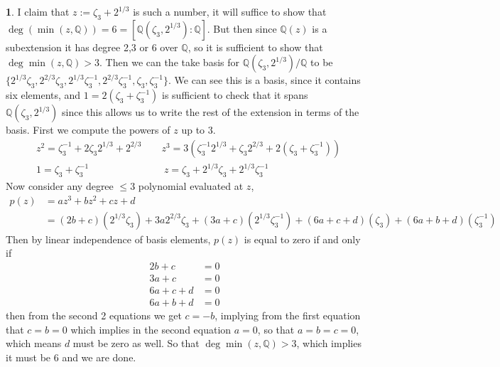 \documentclass[11pt]{article}
\theoremstyle{definition}
\newtheorem{pb}{}
\newcommand{\set}[1]{\{#1\}}
\begin{document}
    \begin{pb}
        I claim that \(z := \zeta_3 + 2^{1/3}\) is such a number, it will suffice to show that \(\deg(\min(z,\mathbb{Q})) = 6 = [\mathbb{Q}(\zeta_3,2^{1/3}):\mathbb{Q}]\).
        But then since \(\mathbb{Q}(z)\) is a subextension it has degree 2,3 or 6 over \(\mathbb{Q}\), so it is sufficient to show that \(\deg \min(z,\mathbb{Q}) > 3\).
        Then we can the take basis for \(\mathbb{Q}(\zeta_3,2^{1/3})/\mathbb{Q}\) to be \(\set{2^{1/3}\zeta_3,2^{2/3}\zeta_3,2^{1/3}\zeta_3^{-1},2^{2/3}\zeta_3^{-1},\zeta_3,\zeta_3^{-1}}\).
        We can see this is a basis, since it contains six elements, and \(1 = 2(\zeta_3 + \zeta_3^{-1})\) is sufficient to check that it spans \(\mathbb{Q}(\zeta_3,2^{1/3})\)
        since this allows us to write the rest of the extension in terms of the basis. First we compute the powers of \(z\) up to \(3\).
        \begin{align*}
            &z^2 = \zeta_3^{-1} + 2 \zeta_3 2^{1/3} + 2^{2/3} \quad \quad z^3 = 3(\zeta_3^{-1}2^{1/3} + \zeta_3 2^{2/3} + 2(\zeta_3 + \zeta_3^{-1})) \\
            &1 = \zeta_3 + \zeta_3^{-1} \quad \quad \quad \quad \quad \quad \quad \;\; z = \zeta_3 + 2^{1/3}\zeta_3 + 2^{1/3}\zeta_3^{-1}
        \end{align*}
        Now consider any degree \(\leq 3\) polynomial evaluated at \(z\),
        \begin{align*}
            p(z) &= az^3 + bz^2 + cz + d \\
            &= (2b + c) (2^{1/3}\zeta_3) + 3a 2^{2/3}\zeta_3 + (3a + c) (2^{1/3}\zeta_3^{-1}) + (6a + c + d)(\zeta_3) + (6a + b + d)(\zeta_3^{-1})
        \end{align*}
        Then by linear independence of basis elements, \(p(z)\) is equal to zero if and only if
        \begin{align*}
            2b + c &=0 \\
            3a + c &=0 \\
            6a+c+d &=0 \\
            6a+b+d &=0
        \end{align*}
        then from the second 2 equations we get \(c = -b\), implying from the first equation that \(c=b = 0\) which implies in the second equation
        \(a = 0\), so that \(a=b=c=0\), which means \(d\) must be zero as well. So that \(\deg \min(z,\mathbb{Q}) > 3\), which implies it must be 6 and we are done.
    \end{pb}
\end{document}
